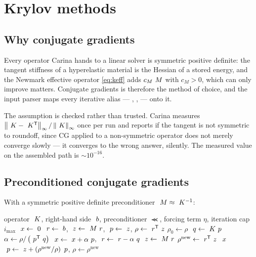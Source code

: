 \chapter{Krylov methods}
\label{ch:krylov}

\section{Why conjugate gradients}

Every operator Carina hands to a linear solver is symmetric positive definite:
the tangent stiffness of a hyperelastic material is the Hessian of a stored
energy, and the Newmark effective operator \eqref{eq:keff} adds $c_M~M$ with
$c_M > 0$, which can only improve matters.  Conjugate gradients is therefore
the method of choice, and the input parser maps every iterative alias
--- , ,  --- onto it.

The assumption is checked rather than trusted.  Carina measures
$\left\lVert ~K - ~K^{\mathsf{T}} \right\rVert_\infty / \left\lVert ~K \right\rVert_\infty$ once per run
and reports if the tangent is not symmetric to roundoff, since CG applied to a
non-symmetric operator does not merely converge slowly --- it converges to the
wrong answer, silently.  The measured value on the assembled path is
$\sim 10^{-16}$.

\section{Preconditioned conjugate gradients}
\label{sec:pcg}

With a symmetric positive definite preconditioner $~M \approx ~K^{-1}$:

\begin{algorithm}[h]
\caption{Preconditioned conjugate gradients}
\label{alg:pcg}
\begin{algorithmic}[1]
  \Require operator $~K$, right-hand side $~b$, preconditioner $\Prec$,
           forcing term $\eta$, iteration cap $i_{\max}$
  \State $~x \gets ~0$
  \State $~r \gets ~b$,\quad
         $~z \gets ~M~r$,\quad
         $~p \gets ~z$,\quad
         $\rho \gets ~r^{\mathsf{T}}~z$
  \State $\rho_0 \gets \rho$
    \State $~q \gets ~K~p$
    \State $\alpha \gets \rho / \left(~p^{\mathsf{T}}~q\right)$
    \State $~x \gets ~x + \alpha~p$,\quad
           $~r \gets ~r - \alpha~q$
    \State $~z \gets ~M~r$
    \State $\rho^{\mathrm{new}} \gets ~r^{\mathsf{T}}~z$
      \State \Return $~x$
    \EndIf
    \State $~p \gets ~z + \left(\rho^{\mathrm{new}}/\rho\right)~p$,\quad
           $\rho \gets \rho^{\mathrm{new}}$
  \EndFor
\end{algorithmic}
\end{algorithm}


